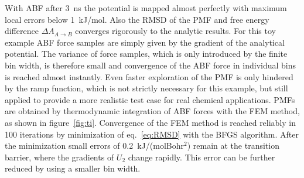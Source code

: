 With ABF after 3~ns the potential is mapped almost perfectly with maximum local errors below 1~kJ/mol.
Also the RMSD of the PMF and free energy difference $\Delta A_{A\to B}$ converges rigorously to the analytic results.
For this toy example ABF force samples are simply given by the gradient of the analytical potential.
The variance of force samples, which is only introduced by the finite bin width, is therefore small and convergence of the ABF force in individual bins is reached almost instantly.
Even faster exploration of the PMF is only hindered by the ramp function, which is not strictly necessary for this example, but still applied to provide a more realistic test case for real chemical applications.
PMFs are obtained by thermodynamic integration of ABF forces with the FEM method, as shown in figure~\ref{fig:ti}.
Convergence of the FEM method is reached reliably in 100 iterations by minimization of eq.~\ref{eq:RMSD} with the BFGS algorithm.
After the minimization small errors of 0.2~kJ/(molBohr$^2$) remain at the transition barrier, where the gradients of $U_2$ change rapidly.
This error can be further reduced by using a smaller bin width.

